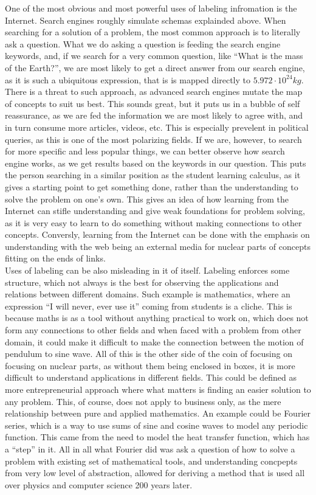 \documentclass{report}
\begin{document}
One of the most obvious and most powerful uses of labeling infromation is the Internet. Search engines roughly simulate schemas explainded above. When searching
for a solution of a problem, the most common approach is to literally ask a question. What we do asking a question is feeding the search engine keywords, and, if
we search for a very common question, like ``What is the mass of the Earth?'', we are most likely to get a direct answer from our search engine, as it is such a 
ubiquitous expression, that is is mapped directly to $5.972 \cdot 10^{24} kg$. There is a threat to such approach, as advanced search engines mutate the map of
concepts to suit us best. This sounds great, but it puts us in a bubble of self reassurance, as we are fed the information we are most likely to agree with, and
in turn consume more articles, videos, etc. This is especially prevelent in political queries, as this is one of the most polarizing fields. If we are, however, to
search for more specific and less popular things, we can better observe how search engine works, as we get results based on the keywords in our question. This puts 
the person searching in a similar position as the student learning calculus, as it gives a starting point to get something done, rather than the understanding to
solve the problem on one's own. This gives an idea of how learning from the Internet can stifle understanding and give weak foundations for problem solving, as it 
is very easy to learn to do something without making connections to other concepts. Conversly, learning from the Internet can be done with the emphasis on understanding
with the web being an external media for nuclear parts of concepts fitting on the ends of links. \\

Uses of labeling can be also misleading in it of itself. Labeling enforces some structure, which not always is the best for observing the applications and relations
between different domains. Such example is mathematics, where an expression ``I will never, ever use it'' coming from students is a cliche. This is because maths is 
as a tool without anything practical to work on, which does not form any connections to other fields and when faced with a problem from other domain, it could make 
it difficult to make the connection between the motion of pendulum to sine wave. All of this is the other side of the coin of focusing on focusing on nuclear parts, 
as without them being enclosed in boxes, it is more difficult to understand applications in different fields. This could be defined as more entrepreneurial approach
where what matters is finding an easier solution to any problem. This, of course, does not apply to business only, as the mere relationship between pure and applied 
mathematics. An example could be Fourier series, which is a way to use sums of sine and cosine waves to model any periodic function. This came from the need to model
the heat transfer function, which has a ``step'' in it. All in all what Fourier did was ask a question of how to solve a problem with existing set of mathematical tools, 
and understanding concpepts from very low level of abstraction, allowed for deriving a method that is used all over physics and computer science 200 years later.
\end{document}

